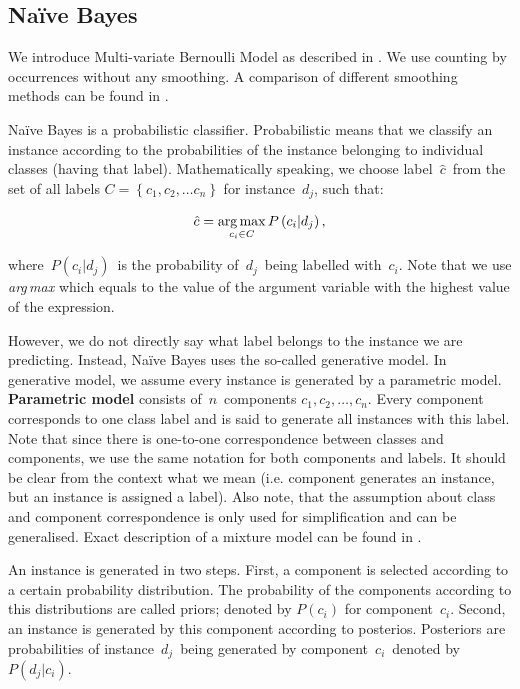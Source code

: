 \subsection{Na\"{i}ve Bayes}

We introduce Multi-variate Bernoulli Model as described in \citet{mccallum1998comparison}.
We use counting by occurrences without any smoothing.
A comparison of different smoothing methods can be found in \citet{yuan2012enhancing}.

Na\"{i}ve Bayes is a probabilistic classifier.
Probabilistic means that we classify an instance according to the probabilities of the instance belonging to individual classes (having that label).
Mathematically speaking, we choose label~$\hat{c}$~from the set of all labels $C=\left\{c_1,c_2,\dots c_n\right\}$ for instance~$d_j$, such that:

\begin{equation}
	\label{eq:argmax}
	\hat{c} = \operatorname*{arg\,max}_{c_i \in C} P\left(c_i  | d_j \right),
\end{equation}

where~$P\left(c_i | d_j\right)$~is the probability of~$d_j$~being labelled with~$c_i$.
Note that we use \textit{arg\,max} which equals to the value of the argument variable
with the highest value of the expression.

However, we do not directly say what label belongs to the instance we are predicting.
Instead, Na\"{i}ve Bayes uses the so-called generative model.
In generative model, we assume every instance is generated by a parametric model.
\textbf{Parametric model} consists of~$n$~components $c_1, c_2,\ldots, c_n$.
Every component corresponds to one class label
and is said to generate all instances with this label.
Note that since there is one-to-one correspondence between classes and components,
we use the same notation for both components and labels.
It should be clear from the context what we mean (i.e. component generates an instance,
but an instance is assigned a label).
Also note, that the assumption about class and component correspondence is only used for simplification and can be generalised.
Exact description of a mixture model can be found in 
\citet{DBLP:journals/corr/cmp-lg-9705005}.

An instance is generated in two steps.
First, a component is selected according to a certain probability distribution.
The probability of the components according to this distributions are
called priors; denoted by $P\left(c_i\right)$ for component~$c_i$.
Second, an instance is generated by this component according to posterios.
Posteriors are probabilities of instance~$d_j$~being generated by component~$c_i$~denoted by~$P\left(d_j|c_i\right)$.

